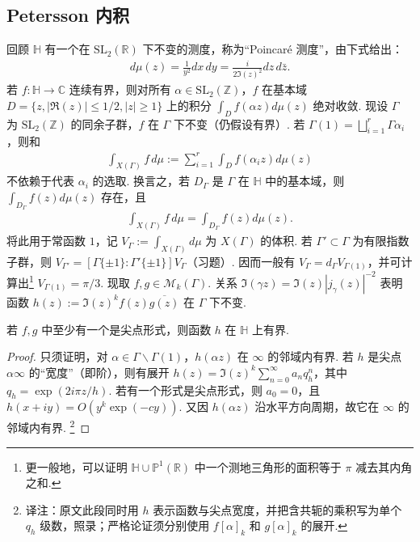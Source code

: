 \subsection{Petersson 内积}\label{sec:modular-1-2-8}
回顾 $\mathbb H$ 有一个在 $\mathrm{SL}_2(\mathbb R)$ 下不变的测度，称为``Poincaré 测度''，由下式给出：
\begin{align*}
d\mu(z)=\frac{1}{y^2}dx\,dy=\frac{i}{2\Im(z)^2}dz\,d\bar z.
\end{align*}
若 $f:\mathbb H\to\mathbb C$ 连续有界，则对所有 $\alpha\in\mathrm{SL}_2(\mathbb Z)$，$f$ 在基本域 $D=\{z,|\Re(z)|\leqslant1/2,|z|\geqslant1\}$ 上的积分 $\int_Df(\alpha z)d\mu(z)$ 绝对收敛.
现设 $\Gamma$ 为 $\mathrm{SL}_2(\mathbb Z)$ 的同余子群，$f$ 在 $\Gamma$ 下不变（仍假设有界）. 若 $\Gamma(1)=\bigsqcup_{i=1}^r\Gamma\alpha_i$，则和
\begin{align*}
\int_{X(\Gamma)}f\,d\mu:=\sum_{i=1}^r\int_Df(\alpha_i z)d\mu(z)
\end{align*}
不依赖于代表 $\alpha_i$ 的选取. 换言之，若 $D_\Gamma$ 是 $\Gamma$ 在 $\mathbb H$ 中的基本域，则 $\int_{D_\Gamma}f(z)d\mu(z)$ 存在，且
\begin{align*}
\int_{X(\Gamma)}f\,d\mu=\int_{D_\Gamma}f(z)d\mu(z).
\end{align*}
将此用于常函数 $1$，记 $V_\Gamma:=\int_{X(\Gamma)}d\mu$ 为 $X(\Gamma)$ 的体积. 若 $\Gamma'\subset\Gamma$ 为有限指数子群，则 $V_{\Gamma'}=[\Gamma\{\pm1\}:\Gamma'\{\pm1\}]V_\Gamma$（习题）. 因而一般有 $V_\Gamma=d_\Gamma V_{\Gamma(1)}$，并可计算出\footnote{更一般地，可以证明 $\mathbb H\cup\mathbb P^1(\mathbb R)$ 中一个测地三角形的面积等于 $\pi$ 减去其内角之和.} $V_{\Gamma(1)}=\pi/3$.
现取 $f,g\in\mathcal M_k(\Gamma)$. 关系 $\Im(\gamma z)=\Im(z)|j_\gamma(z)|^{-2}$ 表明函数 $h(z):=\Im(z)^kf(z)\overline{g(z)}$ 在 $\Gamma$ 下不变.
\begin{lemma*}
若 $f,g$ 中至少有一个是尖点形式，则函数 $h$ 在 $\mathbb H$ 上有界.
\end{lemma*}
\begin{proof}
只须证明，对 $\alpha\in\Gamma\backslash\Gamma(1)$，$h(\alpha z)$ 在 $\infty$ 的邻域内有界. 若 $h$ 是尖点 $\alpha\infty$ 的``宽度''（即阶），则有展开 $h(z)=\Im(z)^k\sum_{n=0}^\infty a_nq_h^n$，其中 $q_h=\exp(2i\pi z/h)$. 若有一个形式是尖点形式，则 $a_0=0$，且 $h(x+iy)=O(y^k\exp(-cy))$. 又因 $h(\alpha z)$ 沿水平方向周期，故它在 $\infty$ 的邻域内有界.
\footnote{译注：原文此段同时用 $h$ 表示函数与尖点宽度，并把含共轭的乘积写为单个 $q_h$ 级数，照录；严格论证须分别使用 $f[\alpha]_k$ 和 $g[\alpha]_k$ 的展开.}
\end{proof}

